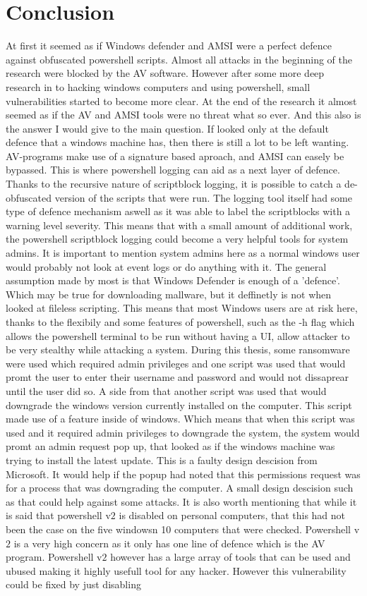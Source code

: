 \documentclass{article}%
\begin{document}
\section{Conclusion}
At first it seemed as if Windows defender and AMSI were a perfect defence against obfuscated powershell scripts. Almost all attacks in the beginning of the research were blocked by the AV software. However after some more deep research in to hacking windows computers and using powershell, small vulnerabilities started to become more clear. At the end of the research it almost seemed as if the AV and AMSI tools were no threat what so ever. And this also is the answer I would give to the main question. If looked only at the default defence that a windows machine has, then there is still a lot to be left wanting. AV-programs make use of a signature based aproach, and AMSI can easely be bypassed. This is where powershell logging can aid as a next layer of defence. Thanks to the recursive nature of scriptblock logging, it is possible to catch a de-obfuscated version of the scripts that were run. The logging tool itself had some type of defence mechanism aswell as it was able to label the scriptblocks with a warning level severity. This means that with a small amount of additional work, the powershell scriptblock logging could become a very helpful tools for system admins. It is important to mention system admins here as a normal windows user would probably not look at event logs or do anything with it. The general assumption made by most is that Windows Defender is enough of a 'defence'. Which may be true for downloading mallware, but it deffinetly is not when looked at fileless scripting. This means that most Windows users are at risk here, thanks to the flexibily and some features of powershell, such as the -h flag which allows the powershell terminal to be run without having a UI, allow attacker to be very stealthy while attacking a system. During this thesis, some ransomware were used which required admin privileges and one script was used that would promt the user to enter their username and password and would not dissaprear until the user did so. A side from that another script was used that would downgrade the windows version currently installed on the computer. This script made use of a feature inside of windows. Which means that when this script was used and it required admin privileges to downgrade the system, the system would promt an admin request pop up, that looked as if the windows machine was trying to install the latest update. This is a faulty design descision from Microsoft. It would help if the popup had noted that this permissions request was for a process that was downgrading the computer. A small design descision such as that could help against some attacks. It is also worth mentioning that while it is said that powershell v$2$ is disabled on personal computers, that this had not been the case on the five windowsn 10 computers that were checked. Powershell v$2$ is a very high concern as it only has one line of defence which is the AV program. Powershell v$2$ however has a large array of tools that can be used and ubused making it highly usefull tool for any hacker. However this vulnerability could be fixed by just disabling 
\end{document}
